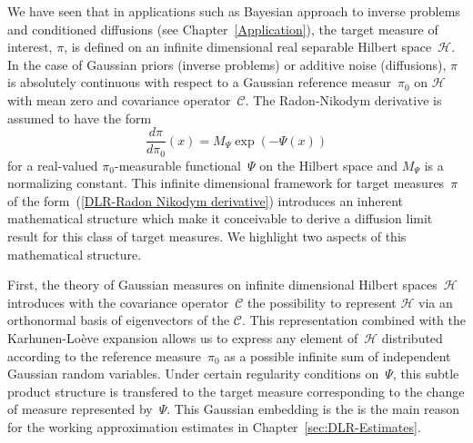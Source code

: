 We have seen that in applications such as Bayesian approach to inverse problems and conditioned diffusions (see Chapter~\ref{Application}), the target measure of interest, $\pi$, is defined on an infinite dimensional real separable Hilbert space~$\mathcal{H}$. In the case of Gaussian priors (inverse problems) or additive noise (diffusions), $\pi$ is absolutely continuous with respect to a Gaussian reference measur~$\pi_0$ on $\mathcal{H}$ with mean zero and covariance operator~$\mathcal{C}$. The Radon-Nikodym derivative is assumed to have the form
\begin{equation}
\label{DLR-Radon Nikodym derivative}
 \frac{d \pi}{d \pi_0}(x) = M_{\Psi} \exp (- \Psi(x))
\end{equation}
for a real-valued $\pi_0$-measurable functional~$\Psi$ on the Hilbert space and $M_{\Psi}$ is a normalizing constant. This infinite dimensional framework for target measures~$\pi$ of the form~(\ref{DLR-Radon Nikodym derivative}) introduces an inherent mathematical structure which make it conceivable to derive a diffusion limit result for this class of target measures. We highlight two aspects of this mathematical structure. 

First, the theory of Gaussian measures on infinite dimensional Hilbert spaces~$\mathcal{H}$ introduces with the covariance operator~$\mathcal{C}$ the possibility to represent $\mathcal{H}$ via an orthonormal basis of eigenvectors of the $\mathcal{C}$. This representation combined with the Karhunen-Lo\`{e}ve expansion allows us to express any element of~$\mathcal{H}$ distributed according to the reference measure~$\pi_0$ as a possible infinite sum of independent Gaussian random variables. Under certain regularity conditions on~$\Psi$, this subtle product structure is transfered to the target measure corresponding to the change of measure represented by~$\Psi$. This Gaussian embedding is the is the main reason for the working approximation estimates in Chapter~\ref{sec:DLR-Estimates}.

